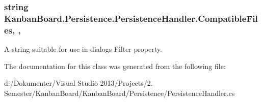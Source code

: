 \subsubsection[{Compatible\+Files}]{\setlength{\rightskip}{0pt plus 5cm}string Kanban\+Board.\+Persistence.\+Persistence\+Handler.\+Compatible\+Files\hspace{0.3cm}{\ttfamily [static]}, {\ttfamily [get]}, {}}\label{class_kanban_board_1_1_persistence_1_1_persistence_handler_adf44508ce2098268782b787d86675b4b}


A string suitable for use in dialogs Filter property. 



The documentation for this class was generated from the following file\+:\begin{DoxyCompactItemize}
\item 
d\+:/\+Dokumenter/\+Visual Studio 2013/\+Projects/2. Semester/\+Kanban\+Board/\+Kanban\+Board/\+Persistence/Persistence\+Handler.\+cs\end{DoxyCompactItemize}
